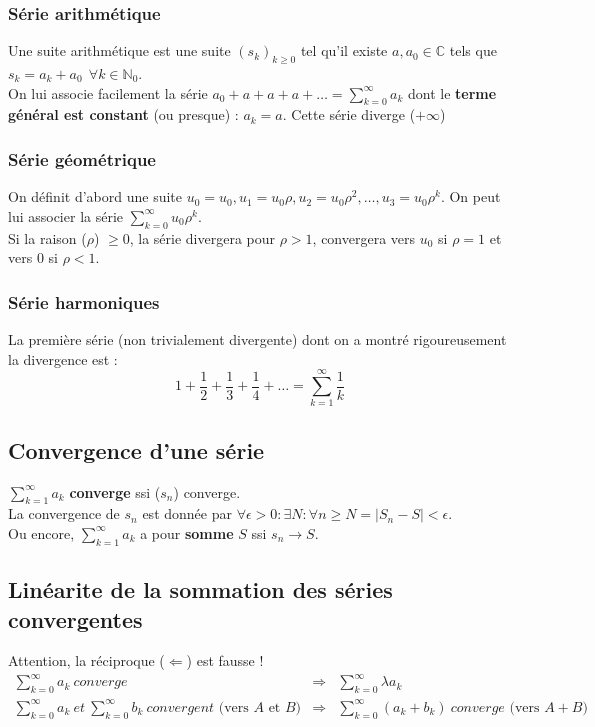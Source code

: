 \documentclass[11pt, a4paper, openany]{book}
\begin{document}
\subsubsection{Série arithmétique}
Une suite arithmétique est une suite $(s_k)_{k \geq 0}$ tel qu'il existe $a, a_0 \in \mathbb{C}$ tels que $s_k = a_k + a_0\ \ \forall k \in \mathbb{N}_0$.\\
On lui associe facilement la série $a_0 + a + a + a + \dots = \sum_{k=0}^\infty a_k$ dont  le \textbf{terme général est constant} (ou presque) : $a_k = a$.
Cette série diverge ($+\infty$)
		
\subsubsection{Série géométrique}
On définit d'abord une suite $u_0 = u_0, u_1 = u_0\rho, u_2 = u_0\rho^2,\dots, u_3 = u_0\rho^k$. On peut lui associer la série $\sum_{k=0}^\infty u_0\rho^k$.\\
Si la raison ($\rho$) $\geq 0$, la série divergera pour $\rho > 1$, convergera vers $u_0$ si $\rho = 1$ et vers $0$ si $\rho < 1$.
		
\subsubsection{Série harmoniques}
La première série (non trivialement divergente) dont on a montré rigoureusement la divergence est :
\begin{equation}
	1 + \frac{1}{2} + \frac{1}{3} + \frac{1}{4} + \dots = \sum_{k=1}^\infty \frac{1}{k}
\end{equation}
		
\setcounter{subsection}{3}
\subsection{Convergence d'une série}
$\sum_{k=1}^\infty a_k$ \textbf{converge} ssi ($s_n$) converge.\\
La convergence de $s_n$ est donnée par $\forall \epsilon > 0 : \exists N : \forall n \geq N = |S_n - S| < \epsilon$.\\
Ou encore, $\sum_{k=1}^\infty a_k$ a pour \textbf{somme} $S$ ssi $s_n \rightarrow S$.
		
\setcounter{subsection}{5}
\subsection{Linéarite de la sommation des séries convergentes}
Attention, la réciproque ($\Leftarrow$) est fausse ! 
\begin{eqnarray}
	\sum_{k=0}^\infty a_k\ converge\ &\Rightarrow & \sum_{k=0}^\infty \lambda a_k\\
	\sum_{k=0}^\infty a_k\ et\ \sum_{k=0}^\infty b_k\ convergent \text{ (vers $A$ et $B$)} & \Rightarrow & \sum_{k=0}^\infty (a_k + b_k)\ converge\text{ (vers $A+B$)}
\end{eqnarray}
		
\end{document}
